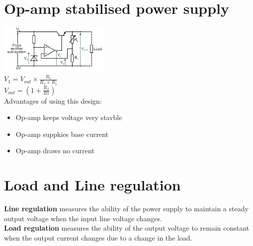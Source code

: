 \documentclass[a4paper, 11pt, twocolumn]{article}
\begin{document}
    \section{Op-amp stabilised power supply}
    \includegraphics[width=0.4\textwidth]{opampStabilised.jpg} \\
    $V_1 = V_{out} \times \frac{R_1}{R_f + R_1}$ \\
    $V_{out} = (1+\frac{R_f}{R1})$ \\
    Advantages of using this design:
    \begin{itemize}
        \item Op-amp keeps voltage very stavble
        \item Op-amp suppkies base current
        \item Op-amp draws no current
    \end{itemize}

    \section{Load and Line regulation}
    \textbf{Line regulation }measures the ability of the power supply to maintain a steady output voltage when the input line voltage changes. \\
    \textbf{Load regulation }measures the ability of the output voltage to remain constant when the output current changes due to a change in the load.
\end{document}
